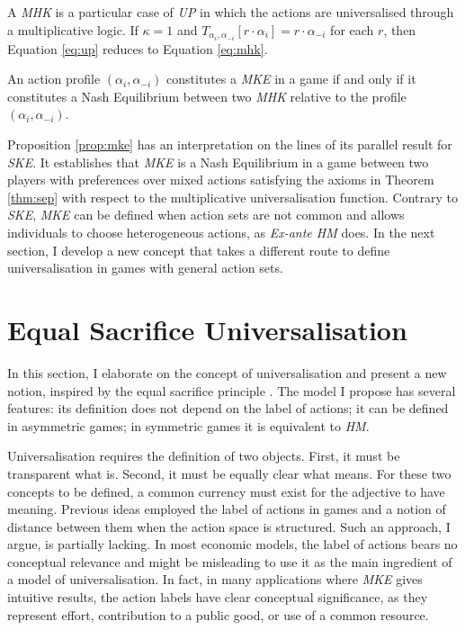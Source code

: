 A \textit{MHK} is a particular case of \textit{UP} in which the actions are universalised through a multiplicative logic. If \( \kappa = 1 \) and \( T_{\alpha_i, \alpha_{-i}} [ r \cdot \alpha_i ] = r \cdot \alpha_{-i} \) for each \( r \), then Equation \eqref{eq:up} reduces to Equation \eqref{eq:mhk}.

\begin{prop}\label{prop:mke}
	An action profile \( (\alpha_i, \alpha_{-i}) \) constitutes a \textit{MKE} in a game if and only if it constitutes a Nash Equilibrium between two \textit{MHK} relative to the profile \( ( \alpha_{i}, \alpha_{-i} ) \).
\end{prop}

Proposition \ref{prop:mke} has an interpretation on the lines of its parallel result for \textit{SKE}. It establishes that \textit{MKE} is a Nash Equilibrium in a game between two players with preferences over mixed actions satisfying the axioms in Theorem \ref{thm:sep} with respect to the multiplicative universalisation function. Contrary to \textit{SKE}, \textit{MKE} can be defined when action sets are not common and allows individuals to choose heterogeneous actions, as \textit{Ex-ante HM} does. In the next section, I develop a new concept that takes a different route to define universalisation in games with general action sets.

\section{Equal Sacrifice Universalisation}\label{sec:esu}

In this section, I elaborate on the concept of universalisation and present a new notion, inspired by the equal sacrifice principle \citep{millPrinciplesPoliticalEconomy1885,youngDistributiveJusticeTaxation1988}. The model I propose has several features: its definition does not depend on the label of actions; it can be defined in asymmetric games; in symmetric games it is equivalent to \textit{HM}.

Universalisation requires the definition of two objects. First, it must be transparent what  is. Second, it must be equally clear what  means. For these two concepts to be defined, a common currency must exist for the adjective  to have meaning. Previous ideas employed the label of actions in games and a notion of distance between them when the action space is structured. Such an approach, I argue, is partially lacking. In most economic models, the label of actions bears no conceptual relevance and might be misleading to use it as the main ingredient of a model of universalisation. In fact, in many applications where \textit{MKE} gives intuitive results, the action labels have clear conceptual significance, as they represent effort, contribution to a public good, or use of a common resource.


